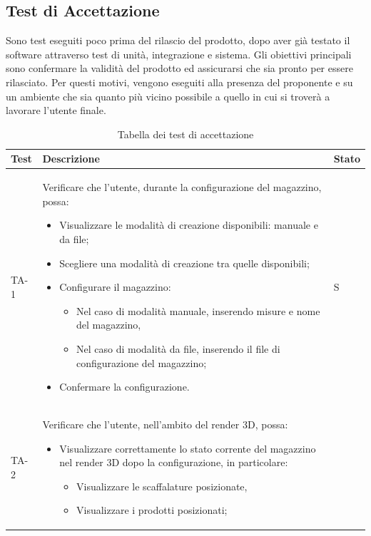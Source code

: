 \subsection{Test di Accettazione}
Sono test eseguiti poco prima del rilascio del prodotto, dopo aver già testato il software attraverso test di unità, integrazione e sistema. Gli obiettivi principali sono confermare la validità del prodotto ed assicurarsi che sia pronto per essere rilasciato. Per questi motivi, vengono eseguiti alla presenza del proponente e su un ambiente che sia quanto più vicino possibile a quello in cui si troverà a lavorare l'utente finale.
\renewcommand{\arraystretch}{1.5}
\begin{xltabular}{0.9\textwidth}{X | p{0.7\textwidth} | X}
    \textbf{\color{white} Test} & \textbf{\color{white} Descrizione} & \textbf{\color{white} Stato}\\ 
    \hline
    \endhead
    \caption{Tabella dei test di accettazione} 
    \label{tab:test_accettazione}
    \endlastfoot
    TA-1 & Verificare che l'utente, durante la configurazione del magazzino, possa:
    \begin{itemize}
        \item Visualizzare le modalità di creazione disponibili: manuale e da file;
        \item Scegliere una modalità di creazione tra quelle disponibili;
        \item Configurare il magazzino:
        \begin{itemize}
            \item Nel caso di modalità manuale, inserendo misure e nome del magazzino,
            \item Nel caso di modalità da file, inserendo il file di configurazione del magazzino;
        \end{itemize}
        \item Confermare la configurazione.
    \end{itemize} 
    & S \\
    TA-2 & Verificare che l'utente, nell'ambito del render 3D, possa:
    \begin{itemize}
        \item Visualizzare correttamente lo stato corrente del magazzino nel render 3D dopo la configurazione, in particolare:
        \begin{itemize}
            \item Visualizzare le scaffalature posizionate,
            \item Visualizzare i prodotti posizionati;

\end{itemize}
\end{itemize}
\end{xltabular}
